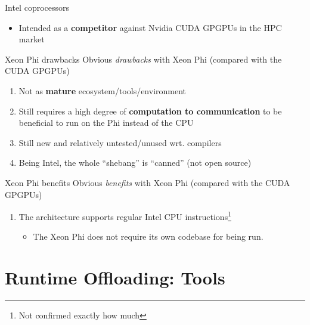 \documentclass[screen]{beamer}
\begin{document}
\begin{frame}{Intel coprocessors}
    \pause
    \begin{itemize}
        \item Intended as a \textbf{competitor} against Nvidia CUDA GPGPUs in the HPC market
    \end{itemize}
\end{frame}

\begin{frame}{Xeon Phi drawbacks}
    Obvious \textit{drawbacks} with Xeon Phi (compared with the CUDA GPGPUs)
    \begin{enumerate}[<+-| alert@+>]
        \item Not as \textbf{mature} ecosystem/tools/environment
        \item Still requires a high degree of \textbf{computation to communication} to be beneficial to run on the Phi instead of the CPU
        \item Still new and relatively untested/unused wrt. compilers
        \item Being Intel, the whole ``shebang'' is ``canned'' (not open source)
    \end{enumerate}
\end{frame}

\begin{frame}{Xeon Phi benefits}
    Obvious \textit{benefits} with Xeon Phi (compared with the CUDA GPGPUs)
    \begin{enumerate}[<+-| alert@+>]
        \item The architecture supports regular Intel CPU instructions\footnote{Not confirmed exactly how much}
        \begin{itemize}[<+-| alert@+>]
            \item The Xeon Phi does not require its own codebase for being run.
        \end{itemize}
    \end{enumerate}
\end{frame}

\section{Runtime Offloading: Tools}
\end{document}
